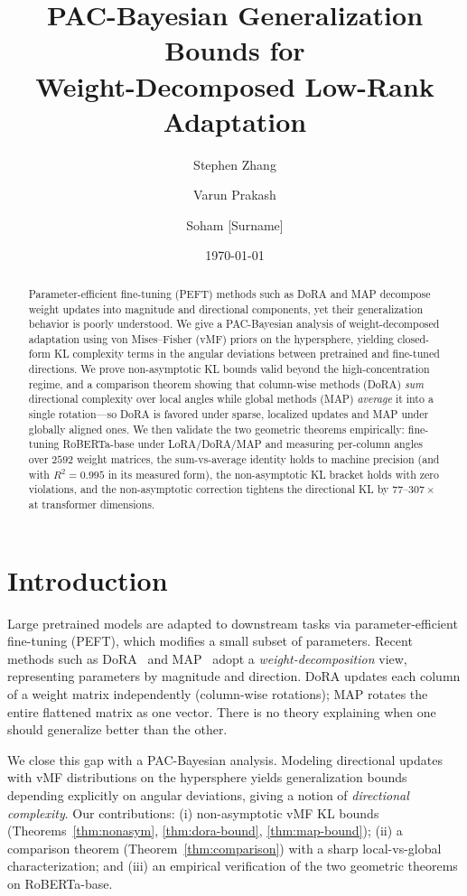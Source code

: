 \documentclass[11pt]{article}
\title{\textbf{PAC-Bayesian Generalization Bounds for\\
Weight-Decomposed Low-Rank Adaptation}}
\author{Stephen Zhang \and Varun Prakash \and Soham [Surname]}
\date{\today}
\begin{document}
\maketitle
\vspace{-1.5em}

\begin{abstract}
\small
Parameter-efficient fine-tuning (PEFT) methods such as DoRA and MAP decompose weight
updates into magnitude and directional components, yet their generalization behavior
is poorly understood. We give a PAC-Bayesian analysis of weight-decomposed adaptation
using von Mises--Fisher (vMF) priors on the hypersphere, yielding closed-form KL
complexity terms in the angular deviations between pretrained and fine-tuned
directions. We prove non-asymptotic KL bounds valid beyond the high-concentration
regime, and a comparison theorem showing that column-wise methods (DoRA)
\emph{sum} directional complexity over local angles while global methods (MAP)
\emph{average} it into a single rotation---so DoRA is favored under sparse, localized
updates and MAP under globally aligned ones. We then validate the two geometric
theorems empirically: fine-tuning RoBERTa-base under LoRA/DoRA/MAP and measuring
per-column angles over $2592$ weight matrices, the sum-vs-average identity holds to
machine precision (and with $R^2{=}0.995$ in its measured form), the non-asymptotic
KL bracket holds with zero violations, and the non-asymptotic correction tightens the
directional KL by $77$--$307\times$ at transformer dimensions.
\end{abstract}

\section{Introduction}
Large pretrained models are adapted to downstream tasks via parameter-efficient
fine-tuning (PEFT), which modifies a small subset of parameters. Recent methods such
as DoRA~\cite{dora} and MAP~\cite{map} adopt a \emph{weight-decomposition} view,
representing parameters by magnitude and direction. DoRA updates each column of a
weight matrix independently (column-wise rotations); MAP rotates the entire flattened
matrix as one vector. There is no theory explaining when one should generalize better
than the other.

We close this gap with a PAC-Bayesian analysis. Modeling directional updates with vMF
distributions on the hypersphere yields generalization bounds depending explicitly on
angular deviations, giving a notion of \emph{directional complexity}. Our
contributions: (i) non-asymptotic vMF KL bounds (Theorems~\ref{thm:nonasym},
\ref{thm:dora-bound}, \ref{thm:map-bound}); (ii) a comparison theorem
(Theorem~\ref{thm:comparison}) with a sharp local-vs-global characterization; and
(iii) an empirical verification of the two geometric theorems on RoBERTa-base.
\end{document}
